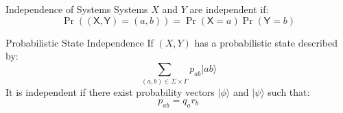 \documentclass[12pt, aspectratio=169]{beamer}
\begin{document}
\begin{frame}{Independence of Systems}
    Systems \(X\) and \(Y\) are independent if:
    \[
    \operatorname{Pr}((\mathsf{X},\mathsf{Y}) = (a,b)) = \operatorname{Pr}(\mathsf{X} = a) \operatorname{Pr}(\mathsf{Y} = b)
    \]
\end{frame}

\begin{frame}{Probabilistic State Independence}
    If \((X, Y)\) has a probabilistic state described by:
    \[
    \sum_{(a,b) \in \Sigma\times\Gamma} p_{ab} \vert a b\rangle
    \]
    It is independent if there exist probability vectors \(\vert \phi \rangle\) and \(\vert \psi \rangle\) such that:
    \[
    p_{ab} = q_a r_b
    \]
\end{frame}

\end{document}
